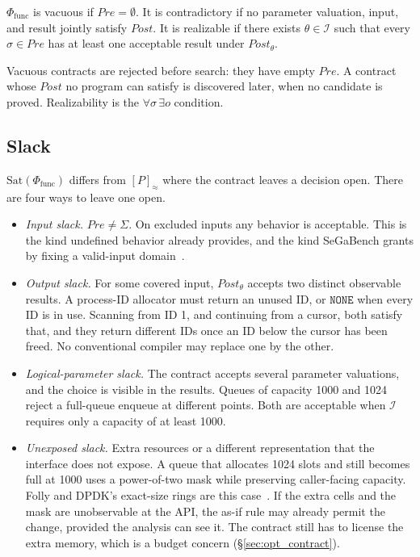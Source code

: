 \begin{definition}[Realizability]
\(\Phi_{\text{func}}\) is vacuous if \(\mathit{Pre} = \emptyset\). It is
contradictory if no parameter valuation, input, and result jointly satisfy
\(\mathit{Post}\). It is realizable if there exists \(\theta \in \mathcal{I}\)
such that every \(\sigma \in \mathit{Pre}\) has at least one acceptable
result under \(\mathit{Post}_\theta\).
\end{definition}

Vacuous contracts are rejected before search: they have empty
\(\mathit{Pre}\). A contract whose \(\mathit{Post}\) no program can satisfy
is discovered later, when no candidate is proved. Realizability is the
\(\forall\sigma\,\exists o\) condition.

\subsection{Slack}
\label{sec:slack}

\(\mathrm{Sat}(\Phi_{\text{func}})\) differs from \([P]_\approx\) where the
contract leaves a decision open. There are four ways to leave one open.

\begin{itemize}
  \item \emph{Input slack.} \(\mathit{Pre} \neq \Sigma\). On excluded inputs
  any behavior is acceptable. This is the kind undefined behavior already
  provides, and the kind SeGaBench grants by fixing a valid-input
  domain~\cite{jiang2026segabench}.
  \item \emph{Output slack.} For some covered input, \(\mathit{Post}_\theta\)
  accepts two distinct observable results. A process-ID allocator must return
  an unused ID, or \(\texttt{NONE}\) when every ID is in use. Scanning from
  ID 1, and continuing from a cursor, both satisfy that, and they return
  different IDs once an ID below the cursor has been freed. No conventional
  compiler may replace one by the other.
  \item \emph{Logical-parameter slack.} The contract accepts several
  parameter valuations, and the choice is visible in the results. Queues of
  capacity 1000 and 1024 reject a full-queue enqueue at different points. Both
  are acceptable when \(\mathcal{I}\) requires only a capacity of at least
  1000.
  \item \emph{Unexposed slack.} Extra resources or a different representation
  that the interface does not expose. A queue that allocates 1024 slots and
  still becomes full at 1000 uses a power-of-two mask while preserving
  caller-facing capacity. Folly and DPDK's exact-size rings are this
  case~\cite{folly_pcq,dpdk_rte_ring}. If the extra cells and the mask are
  unobservable at the API, the as-if rule may already permit the change,
  provided the analysis can see it. The contract still has to license the
  extra memory, which is a budget concern
  (\S\ref{sec:opt_contract}).
\end{itemize}

